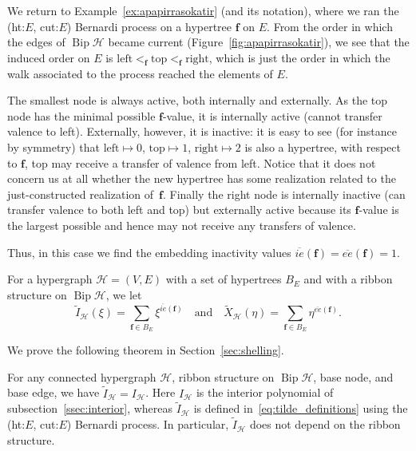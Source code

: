 \documentclass[ALCO,ThmDefs,Unicode,epreuves]{cedram}
\newcommand{\HH}{\mathcal H}
\DeclareMathOperator{\bip}{Bip}
\begin{document}
\begin{exam}
We return to Example~\ref{ex:apapirrasokatir} (and its notation), where we ran the (ht:$E$, cut:$E$) Bernardi process on a hypertree $\mathbf f$ on $E$. From the order in which the edges of $\bip\HH$ became current (\cf Figure~\ref{fig:apapirrasokatir}), we see that the induced order on $E$ is $\text{left}<_{\mathbf f}\text{top}<_{\mathbf f}\text{right}$, which is just the order in which the walk associated to the process reached the elements of $E$.

The smallest node is always active, both internally and externally. As the top node has the minimal possible $\mathbf f$-value, it is internally active (cannot transfer valence to left). Externally, however, it is inactive: it is easy to see (for instance by symmetry) that $\text{left}\mapsto0$, $\text{top}\mapsto1$, $\text{right}\mapsto2$ is also a hypertree, \ie with respect to $\mathbf f$, top may receive a transfer of valence from left. Notice that it does not concern us at all whether the new hypertree has some realization related to the just-constructed realization of~$\mathbf f$. Finally the right node is internally inactive (can transfer valence to both left and top) but externally active because its $\mathbf f$-value is the largest possible and hence may not receive any transfers of valence.

Thus, in this case we find the embedding inactivity values $\overline{ie}(\mathbf f)=\overline{ee}(\mathbf f)=1$.
\end{exam}

\begin{defi}
For a hypergraph $\HH=(V,E)$ with a set of hypertrees $B_E$ and with a ribbon structure on $\bip\HH$, we let
\begin{equation}
\label{eq:tilde_definitions}
\tilde{I}_\HH(\xi)=\sum_{\mathbf f\in B_E} \xi^{\overline{ie}(\mathbf f)}\quad\text{and}\quad\tilde{X}_\HH(\eta)=\sum_{\mathbf f\in B_E} \eta^{\overline{ee}(\mathbf f)}.
\end{equation}
\end{defi}

We prove the following theorem in Section~\ref{sec:shelling}.

\begin{theo}\label{thm:Bernardi-interior_well_def}
For any connected hypergraph $\HH$, ribbon structure on $\bip\HH$, base node, and base edge, we have $\tilde{I}_\HH=I_\HH$. Here $I_\HH$ is the interior polynomial of subsection~\ref{ssec:interior}, whereas $\tilde{I}_\HH$ is defined in~\eqref{eq:tilde_definitions} using the (ht:$E$, cut:$E$) Bernardi process.
In particular, $\tilde{I}_{\HH}$ does not depend on the ribbon structure.
\end{theo}
\end{document}
